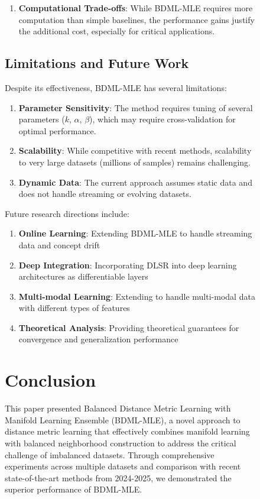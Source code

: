 \documentclass[review]{elsarticle}
\begin{document}
\begin{figure}[htbp]
\begin{enumerate}
\item \textbf{Computational Trade-offs}: While BDML-MLE requires more computation than simple baselines, the performance gains justify the additional cost, especially for critical applications.
\end{enumerate}

\subsection{Limitations and Future Work}

Despite its effectiveness, BDML-MLE has several limitations:

\begin{enumerate}
\item \textbf{Parameter Sensitivity}: The method requires tuning of several parameters ($k$, $\alpha$, $\beta$), which may require cross-validation for optimal performance.

\item \textbf{Scalability}: While competitive with recent methods, scalability to very large datasets (millions of samples) remains challenging.

\item \textbf{Dynamic Data}: The current approach assumes static data and does not handle streaming or evolving datasets.
\end{enumerate}

Future research directions include:

\begin{enumerate}
\item \textbf{Online Learning}: Extending BDML-MLE to handle streaming data and concept drift
\item \textbf{Deep Integration}: Incorporating DLSR into deep learning architectures as differentiable layers
\item \textbf{Multi-modal Learning}: Extending to handle multi-modal data with different types of features
\item \textbf{Theoretical Analysis}: Providing theoretical guarantees for convergence and generalization performance
\end{enumerate}

\section{Conclusion}
\label{sec:conclusion}

This paper presented Balanced Distance Metric Learning with Manifold Learning Ensemble (BDML-MLE), a novel approach to distance metric learning that effectively combines manifold learning with balanced neighborhood construction to address the critical challenge of imbalanced datasets. Through comprehensive experiments across multiple datasets and comparison with recent state-of-the-art methods from 2024-2025, we demonstrated the superior performance of BDML-MLE.


\end{figure}
\end{document}
